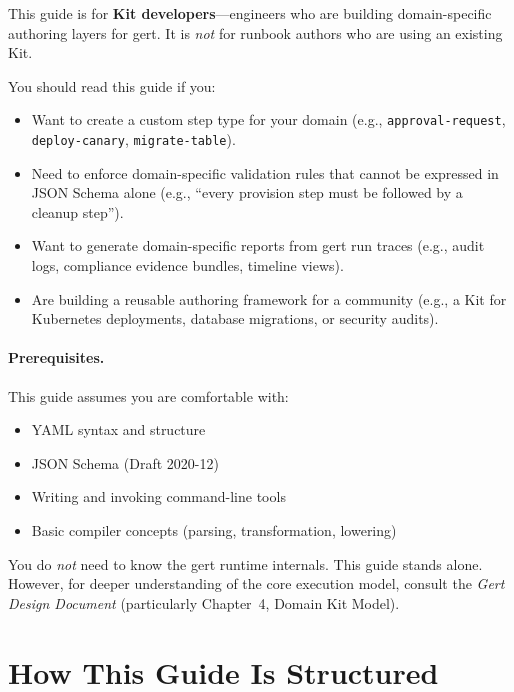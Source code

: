 This guide is for \textbf{Kit developers}---engineers who are building
domain-specific authoring layers for gert. It is \emph{not} for runbook authors
who are using an existing Kit.

You should read this guide if you:

\begin{itemize}
  \item Want to create a custom step type for your domain (e.g.,
    \texttt{approval-request}, \texttt{deploy-canary}, \texttt{migrate-table}).
  \item Need to enforce domain-specific validation rules that cannot be
    expressed in JSON Schema alone (e.g., ``every provision step must be
    followed by a cleanup step'').
  \item Want to generate domain-specific reports from gert run traces (e.g.,
    audit logs, compliance evidence bundles, timeline views).
  \item Are building a reusable authoring framework for a community (e.g., a
    Kit for Kubernetes deployments, database migrations, or security audits).
\end{itemize}

\paragraph{Prerequisites.}
This guide assumes you are comfortable with:

\begin{itemize}
  \item YAML syntax and structure
  \item JSON Schema (Draft 2020-12)
  \item Writing and invoking command-line tools
  \item Basic compiler concepts (parsing, transformation, lowering)
\end{itemize}

You do \emph{not} need to know the gert runtime internals. This guide stands
alone. However, for deeper understanding of the core execution model, consult
the \emph{Gert Design Document} (particularly Chapter~4, Domain Kit Model).

\section{How This Guide Is Structured}
\label{sec:structure}

